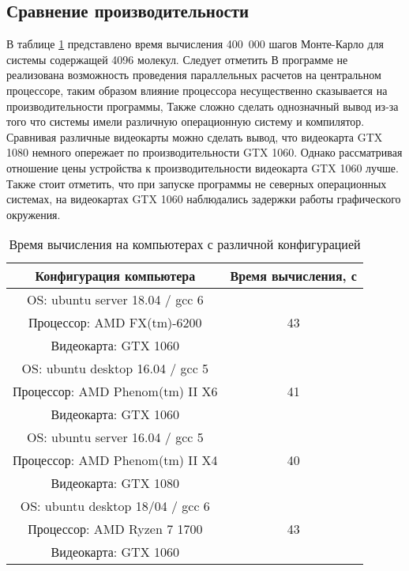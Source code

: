 \subsection{Сравнение производительности}

В таблице \ref{tab.time} представлено время вычисления 400~000 шагов Монте-Карло для системы содержащей 4096 молекул. Следует отметить
В программе не реализована возможность проведения параллельных расчетов на центральном процессоре, таким образом влияние процессора несущественно сказывается на производительности программы, Также сложно сделать однозначный вывод из-за того что системы имели различную операционную систему и компилятор. Сравнивая различные видеокарты можно сделать вывод, что видеокарта GTX 1080 немного опережает по производительности GTX 1060. Однако рассматривая отношение цены устройства к производительности видеокарта GTX 1060 лучше. Также стоит отметить, что при запуске программы не северных операционных системах, на видеокартах GTX 1060 наблюдались задержки работы графического окружения.

\begin{table}[]
	\caption{Время вычисления на компьютерах с различной конфигурацией} \label{tab.time}
	\begin{tabular}{|c|c|}
		\hline
		Конфигурация компьютера & Время вычисления, с \\ \hline
		OS: ubuntu server 18.04 / gcc 6 &\\		
		Процессор: AMD FX(tm)-6200& 43\\
		Видеокарта: GTX 1060 & \\ \hline
		
		OS: ubuntu desktop 16.04 / gcc 5 &\\
		Процессор: AMD Phenom(tm) II X6& 41\\
		Видеокарта: GTX 1060 & \\ \hline
		
		OS: ubuntu server 16.04 / gcc 5 &\\
		Процессор: AMD Phenom(tm) II X4&		40\\
		Видеокарта: GTX 1080 & \\ \hline
		
		OS: ubuntu desktop 18/04 / gcc 6 &\\
		Процессор: AMD Ryzen 7 1700 & 	43\\
		Видеокарта: GTX 1060 & \\ \hline
		
	\end{tabular}
\end{table}





